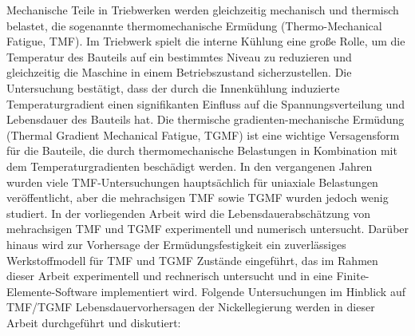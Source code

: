 \noindent
Mechanische Teile in Triebwerken werden gleichzeitig mechanisch und thermisch belastet, die sogenannte thermomechanische Ermüdung (Thermo-Mechanical Fatigue, TMF). Im Triebwerk spielt die interne Kühlung eine große Rolle, um die Temperatur des Bauteils auf ein bestimmtes Niveau zu reduzieren und gleichzeitig die Maschine in einem Betriebszustand sicherzustellen. Die Untersuchung bestätigt, dass der durch die Innenkühlung induzierte Temperaturgradient einen signifikanten Einfluss auf die Spannungsverteilung und Lebensdauer des Bauteils hat. Die thermische gradienten-mechanische Ermüdung (Thermal Gradient Mechanical Fatigue, TGMF) ist eine wichtige Versagensform für die Bauteile, die durch thermomechanische Belastungen in Kombination mit dem Temperaturgradienten beschädigt werden. In den vergangenen Jahren wurden viele TMF-Untersuchungen hauptsächlich für uniaxiale Belastungen veröffentlicht, aber die mehrachsigen TMF sowie TGMF wurden jedoch wenig studiert. In der vorliegenden Arbeit wird die Lebensdauerabschätzung von mehrachsigen TMF und TGMF experimentell und numerisch untersucht. Darüber hinaus wird zur Vorhersage der Ermüdungsfestigkeit ein zuverlässiges Werkstoffmodell für TMF und TGMF Zustände eingeführt, das im Rahmen dieser Arbeit experimentell und rechnerisch untersucht und in eine Finite-Elemente-Software implementiert wird. Folgende Untersuchungen im Hinblick auf TMF/TGMF Lebensdauervorhersagen der Nickellegierung werden in dieser Arbeit durchgeführt und diskutiert:
